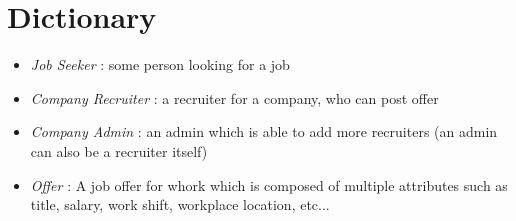 \documentclass[12pt, a4paper]{article}
\begin{document}
\section{Dictionary}

\begin{itemize}
	\item \textit{Job Seeker} : some person looking for a job 
	\item \textit{Company Recruiter} : a recruiter for a company, who can post offer
	\item \textit{Company Admin} : an admin which is able to add more recruiters (an admin can also be a recruiter itself)
	\item \textit{Offer} : A job offer for whork which is composed of multiple attributes such as title, salary, work shift, workplace location, etc...
\end{itemize}
\end{document}
